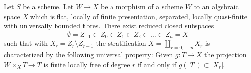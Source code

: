 \begin{lemma}
\label{lemma-quasi-compact-reasonable-stratification}
Let $S$ be a scheme. Let $W \to X$ be a morphism of a scheme $W$
to an algebraic space $X$ which is flat, locally of finite presentation,
separated, locally quasi-finite with universally bounded fibres. There exist
reduced closed subspaces
$$
\emptyset = Z_{-1} \subset Z_0 \subset Z_1 \subset Z_2 \subset
\ldots \subset Z_n = X
$$
such that with $X_r = Z_r \setminus Z_{r - 1}$ the stratification
$X = \coprod_{r = 0, \ldots, n} X_r$ is characterized by the following
universal property: Given $g : T \to X$ the projection
$W \times_X T \to T$ is finite locally free of degree $r$ if and only if
$g(|T|) \subset |X_r|$.
\end{lemma}